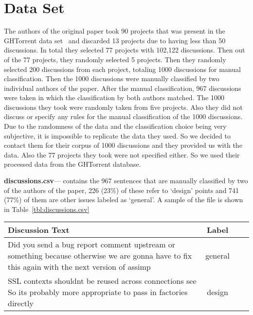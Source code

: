 \section{Data Set}
\label{sect:dataset}
The authors of the original paper took 90 projects that was present in the GHTorrent data set~\cite{Gousios2013} and discarded 13 projects due to having less than 50 discussions. In total they selected 77 projects with 102,122 discussions. Then out of the 77 projects, they randomly selected 5 projects. Then they randomly selected 200 discussions from each project, totaling 1000 discussions for manual classification. Then the 1000 discussions were manually classified by two individual authors of the paper. After the manual classification, 967 discussions were taken in which the classification by both authors matched. The 1000 discussions they took were randomly taken from five projects. Also they did not discuss or specify any rules for the manual classification of the 1000 discussions. Due to the randomness of the data and the classification choice being very subjective, it is impossible to replicate the data they used. So we decided to contact them for their corpus of 1000 discussions and they provided us with the data. Also the 77 projects they took were not specified either. So we used their processed data from the GHTorrent database.

\noindent\textbf{discussions.csv}--- contains the 967 sentences that are manually classified by two of the authors of the paper, 226 (23\%) of these refer to `design' points and 741 (77\%) of them are other issues labeled as `general'. A sample of the file is shown in Table~\ref{tbl:discussions.csv}
\begin{table*}
	\centering
	\caption{Data sample in discussions.csv}
	\label{tbl:discussions.csv}
	\begin{tabular}{lccc} 
		\toprule
		\textbf{Discussion Text} & \textbf{Label}  \\
		\midrule
		Did you send a bug report comment upstream or something because otherwise we are gonna have to fix this again with the next version of assimp & general \\
		SSL contexts shouldnt be reused across connections see So its probably more appropriate to pass in factories directly & design \\
		\bottomrule
	\end{tabular}
\end{table*}

